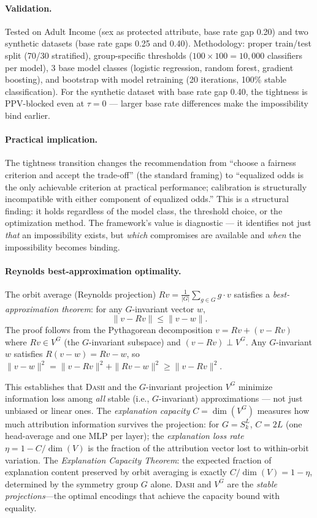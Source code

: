 \documentclass{article}
\newcommand{\DASH}{\textsc{Dash}}
\begin{document}
\paragraph{Validation.}
Tested on Adult Income (sex as protected attribute, base rate gap 0.20) and two synthetic datasets (base rate gaps 0.25 and 0.40). Methodology: proper train/test split (70/30 stratified), group-specific thresholds ($100 \times 100 = 10{,}000$ classifiers per model), 3 base model classes (logistic regression, random forest, gradient boosting), and bootstrap with model retraining (20 iterations, 100\% stable classification). For the synthetic dataset with base rate gap 0.40, the tightness is PPV-blocked even at $\tau = 0$ --- larger base rate differences make the impossibility bind earlier.

\paragraph{Practical implication.}
The tightness transition changes the recommendation from ``choose a fairness criterion and accept the trade-off'' (the standard framing) to ``equalized odds is the only achievable criterion at practical performance; calibration is structurally incompatible with either component of equalized odds.'' This is a structural finding: it holds regardless of the model class, the threshold choice, or the optimization method. The framework's value is diagnostic --- it identifies not just \emph{that} an impossibility exists, but \emph{which} compromises are available and \emph{when} the impossibility becomes binding.

\paragraph{Reynolds best-approximation optimality.}
The orbit average (Reynolds projection) $Rv = \frac{1}{|G|}\sum_{g \in G} g \cdot v$ satisfies a \emph{best-approximation theorem}: for any $G$-invariant vector $w$,
\[
\|v - Rv\| \leq \|v - w\|.
\]
The proof follows from the Pythagorean decomposition $v = Rv + (v - Rv)$ where $Rv \in V^G$ (the $G$-invariant subspace) and $(v - Rv) \perp V^G$. Any $G$-invariant $w$ satisfies $R(v - w) = Rv - w$, so $\|v - w\|^2 = \|v - Rv\|^2 + \|Rv - w\|^2 \geq \|v - Rv\|^2$.

This establishes that \DASH{} and the $G$-invariant projection $V^G$ minimize information loss among \emph{all} stable (i.e., $G$-invariant) approximations --- not just unbiased or linear ones. The \emph{explanation capacity} $C = \dim(V^G)$ measures how much attribution information survives the projection: for $G = S_k^L$, $C = 2L$ (one head-average and one MLP per layer); the \emph{explanation loss rate} $\eta = 1 - C/\dim(V)$ is the fraction of the attribution vector lost to within-orbit variation. The \emph{Explanation Capacity Theorem}: the expected fraction of explanation content preserved by orbit averaging is exactly $C/\dim(V) = 1 - \eta$, determined by the symmetry group $G$ alone. \DASH{} and $V^G$ are the \emph{stable projections}---the optimal encodings that achieve the capacity bound with equality.
\end{document}
